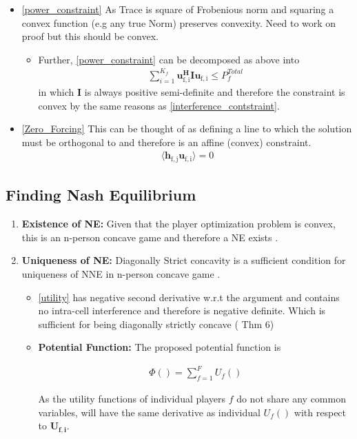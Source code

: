 \documentclass[12pt]{article}
\begin{document}
\begin{enumerate}
\begin{itemize}
\item\eqref{power_constraint} As Trace is square of Frobenious norm and squaring a convex function (e.g any true Norm) preserves convexity.
Need to work on proof but this should be convex.
\begin{itemize}
\item Further, \eqref{power_constraint} can be decomposed as above into
\begin{gather}
\sum_{i=1}^{K_f}\mathbf{u_{\mathrm{f,i}}^H} \mathbf{I} \mathbf{u_{\mathrm{f,i}}} \leq  P^{Total}_{f}
\end{gather}
in which $\mathbf{I}$ is always positive semi-definite and therefore the constraint is convex by the same reasons as \eqref{interference_contstraint}.
\end{itemize}

\item\eqref{Zero_Forcing} 
This can be thought of as defining a line to which the solution must be orthogonal to and therefore is an affine (convex) constraint. 
\begin{gather}
\langle \mathbf{h_{\mathrm{f,j}}}\mathbf{u_{\mathrm{f,i}}} \rangle =0
\end{gather}

\end{itemize}
\end{enumerate}

\subsection{Finding Nash Equilibrium}

\begin{enumerate}
\item \textbf{Existence of NE:} Given that the player optimization problem is convex, this is an n-person concave game and therefore a NE exists \cite{rosen1964existence}. 
\item \textbf{Uniqueness of NE:} Diagonally Strict concavity is a sufficient condition for uniqueness of NNE in n-person concave game \cite{rosen1964existence}.
\begin{itemize}
\item\eqref{utility} has negative second derivative w.r.t the argument and contains no intra-cell interference and therefore is negative definite. Which is sufficient for being diagonally strictly concave
\cite[Thm6]{rosen1964existence} ( Thm 6)

\item \textbf{Potential Function:} The proposed potential function is 

\begin{gather*} \label{Potential_Function}
\Phi() = \sum_{f = 1}^{F} U_f() 
\end{gather*}


As the utility functions of individual players $f$ do not share any common variables,  \label{Potential_Function} will have the same derivative as individual $U_f()$ with respect to $\mathbf{U_{f,i}} $. 


\end{itemize}

\end{enumerate}
\end{document}
